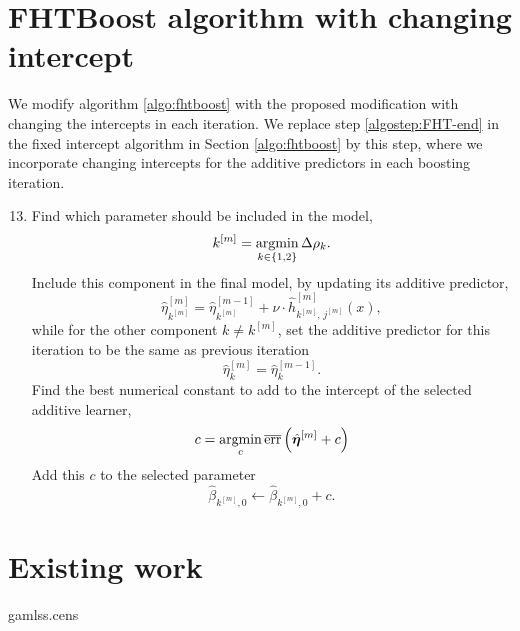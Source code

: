 \section{FHTBoost algorithm with changing intercept}\label{subsec:FHT-intercept}
We modify algorithm \ref{algo:fhtboost} with the proposed modification with changing the intercepts in each iteration.
We replace step \ref{algostep:FHT-end} in the fixed intercept algorithm in Section \ref{algo:fhtboost} by this step, where we incorporate changing intercepts for the additive predictors in each boosting iteration.
\label{algo:fhtboost-with-intercept}
\begin{enumerate}
    \setcounter{enumi}{12}
    \item
        Find which parameter should be included in the model,
        \begin{equation*}
            k^{[m]}=\operatorname*{argmin}_{k\in\{1,2\}}\Delta\rho_k.
        \end{equation*}
        Include this component in the final model, by updating its additive predictor,
        \begin{equation*}
            \hat{\eta}^{[m]}_{k^{[m]}}=\hat{\eta}^{[m-1]}_{k^{[m]}}+\nu\cdot\hat{h}^{[m]}_{k^{[m]},\,j^{[m]}}(x),
        \end{equation*}
        while for the other component $k\neq k^{[m]}$, set the additive predictor for this iteration to be the same as previous iteration
        \begin{equation*}
            \hat{\eta}^{[m]}_{k}=\hat{\eta}^{[m-1]}_{k}.
        \end{equation*}
        Find the best numerical constant to add to the intercept of the selected additive learner,
        \begin{equation}
            c=\operatorname*{argmin}_c \overline{\text{err}}\left(\hat{\boldsymbol{\eta}}^{[m]}+c\right)
        \end{equation}
        Add this $c$ to the selected parameter
        \begin{equation}
            \hat{\beta}_{k^{[m]},0}\gets\hat{\beta}_{k^{[m]},0}+c.
        \end{equation}
\end{enumerate}

\section{Existing work}
gamlss.cens \citep{gamlsscens}


